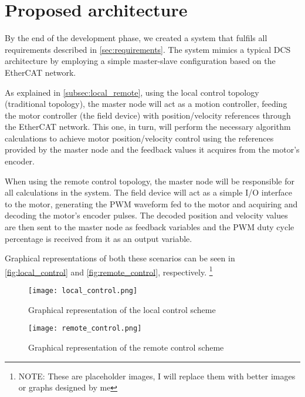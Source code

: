 \section{Proposed architecture} \label{sec:proposed-arch}

By the end of the development phase, we created a system that fulfils all requirements described in \autoref{sec:requirements}.
The system mimics a typical DCS architecture by employing a simple master-slave configuration based on the EtherCAT network.

As explained in \autoref{subsec:local_remote}, using the local control topology (traditional topology), the master node will act as a motion controller, feeding the motor controller (the field device) with position/velocity references through the EtherCAT network.
This one, in turn, will perform the necessary algorithm calculations to achieve motor position/velocity control using the references provided by the master node and the feedback values it acquires from the motor's encoder.

When using the remote control topology, the master node will be responsible for all calculations in the system.
The field device will act as a simple I/O interface to the motor, generating the PWM waveform fed to the motor and acquiring and decoding the motor's encoder pulses.
The decoded position and velocity values are then sent to the master node as feedback variables and the PWM duty cycle percentage is received from it as an output variable.

Graphical representations of both these scenarios can be seen in \autoref{fig:local_control} and \autoref{fig:remote_control}, respectively. \footnote{NOTE: These are placeholder images, I will replace them with better images or graphs designed by me}


\begin{figure}[htp]
	\centering
	\texttt{[image: local\_control.png]}
	\caption{Graphical representation of the local control scheme}
	\label{fig:local_control}
\end{figure}

\begin{figure}[htp]
	\centering
	\texttt{[image: remote\_control.png]}
	\caption{Graphical representation of the remote control scheme}
	\label{fig:remote_control}
\end{figure}





